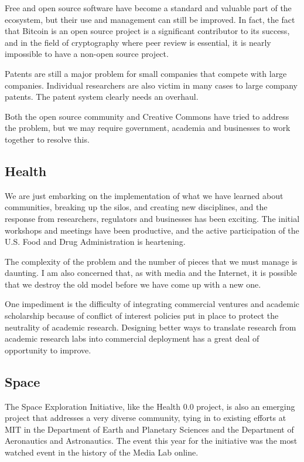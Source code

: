 Free and open source software have become a standard and valuable part of the ecosystem, but their use and management can still be improved. In fact, the fact that Bitcoin is an open source project is a significant contributor to its success, and in the field of cryptography where peer review is essential, it is nearly impossible to have a non-open source project.

Patents are still a major problem for small companies that compete with large companies. Individual researchers are also victim in many cases to large company patents. The patent system clearly needs an overhaul.

Both the open source community and Creative Commons have tried to address the problem, but we may require government, academia and businesses to work together to resolve this.

\subsection{Health}

We are just embarking on the implementation of what we have learned about communities, breaking up the silos, and creating new disciplines, and the response from researchers, regulators and businesses has been exciting. The initial workshops and meetings have been productive, and the active participation of the U.S. Food and Drug Administration is heartening.

The complexity of the problem and the number of pieces that we must manage is daunting. I am also concerned that, as with media and the Internet, it is possible that we destroy the old model before we have come up with a new one.

One impediment is the difficulty of integrating commercial ventures and academic scholarship because of conflict of interest policies put in place to protect the neutrality of academic research. Designing better ways to translate research from academic research labs into commercial deployment has a great deal of opportunity to improve.

\subsection{Space}

The Space Exploration Initiative, like the Health 0.0 project, is also an emerging project that addresses a very diverse community, tying in to existing efforts at MIT in the Department of Earth and Planetary Sciences and the Department of Aeronautics and Astronautics. The event this year for the initiative was the most watched event in the history of the Media Lab online.


